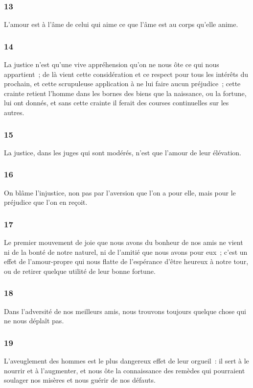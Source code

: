 \documentclass[french,twoside]{book} %
\begin{document}
\subsubsection[{13}]{ \textsc{13} }
\noindent L’amour est à l’âme de celui qui aime ce que l’âme est au corps qu’elle anime.
\subsubsection[{14}]{ \textsc{14} }
\noindent La justice n’est qu’une vive appréhension qu’on ne nous ôte ce qui nous appartient ; de là vient cette considération et ce respect pour tous les intérêts du prochain, et cette scrupuleuse application à ne lui faire aucun préjudice ; cette crainte retient l’homme dans les bornes des biens que la naissance, ou la fortune, lui ont donnés, et sans cette crainte il ferait des courses continuelles sur les autres.
\subsubsection[{15}]{ \textsc{15} }
\noindent La justice, dans les juges qui sont modérés, n’est que l’amour de leur élévation.
\subsubsection[{16}]{ \textsc{16} }
\noindent On blâme l’injustice, non pas par l’aversion que l’on a pour elle, mais pour le préjudice que l’on en reçoit.
\subsubsection[{17}]{ \textsc{17} }
\noindent Le premier mouvement de joie que nous avons du bonheur de nos amis ne vient ni de la bonté de notre naturel, ni de l’amitié que nous avons pour eux ; c’est un effet de l’amour-propre qui nous flatte de l’espérance d’être heureux à notre tour, ou de retirer quelque utilité de leur bonne fortune.
\subsubsection[{18}]{ \textsc{18} }
\noindent Dans l’adversité de nos meilleurs amis, nous trouvons toujours quelque chose qui ne nous déplaît pas.
\subsubsection[{19}]{ \textsc{19} }
\noindent L’aveuglement des hommes est le plus dangereux effet de leur orgueil : il sert à le nourrir et à l’augmenter, et nous ôte la connaissance des remèdes qui pourraient soulager nos misères et nous guérir de nos défauts.
\end{document}
